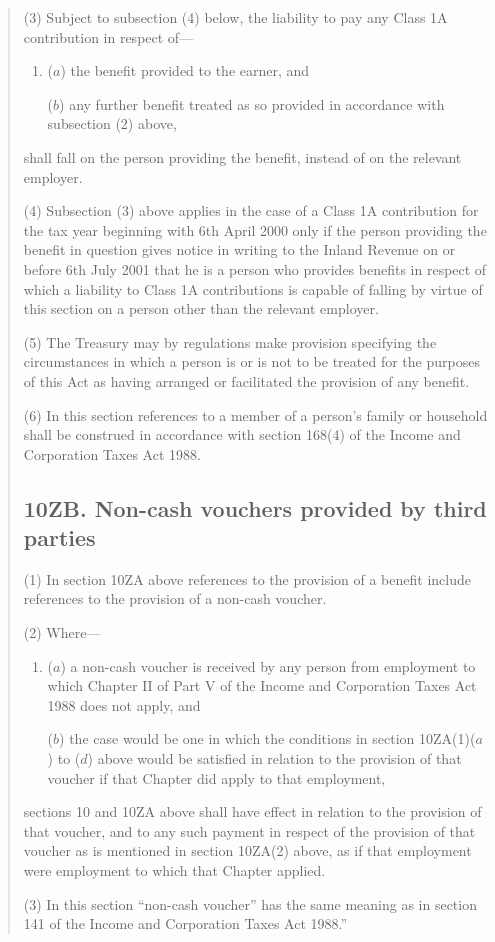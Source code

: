 \documentclass[12pt,a4paper]{article}
\begin{document}
\begin{quotation}
(3) Subject to subsection (4)  below, the liability to pay any Class 1A contribution in respect of—
\begin{enumerate}\item[]
($a$) the benefit provided to the earner, and

($b$) any further benefit treated as so provided in accordance with subsection (2)  above,
\end{enumerate}
shall fall on the person providing the benefit, instead of on the relevant employer.

(4) Subsection (3)  above applies in the case of a Class 1A contribution for the tax year beginning with 6th April 2000 only if the person providing the benefit in question gives notice in writing to the Inland Revenue on or before 6th July 2001 that he is a person who provides benefits in respect of which a liability to Class 1A contributions is capable of falling by virtue of this section on a person other than the relevant employer.

(5) The Treasury may by regulations make provision specifying the circumstances in which a person is or is not to be treated for the purposes of this Act as having arranged or facilitated the provision of any benefit.

(6) In this section references to a member of a person’s family or household shall be construed in accordance with section 168(4)  of the Income and Corporation Taxes Act 1988. 

\subsection*{10ZB. Non-cash vouchers provided by third parties}

(1) In section 10ZA above references to the provision of a benefit include references to the provision of a non-cash voucher.

(2) Where—
\begin{enumerate}\item[]
($a$) a non-cash voucher is received by any person from employment to which Chapter II of Part V of the Income and Corporation Taxes Act 1988 does not apply, and

($b$) the case would be one in which the conditions in section 10ZA(1)($a$)  to ($d$)  above would be satisfied in relation to the provision of that voucher if that Chapter did apply to that employment,
\end{enumerate}
sections 10 and 10ZA above shall have effect in relation to the provision of that voucher, and to any such payment in respect of the provision of that voucher as is mentioned in section 10ZA(2)  above, as if that employment were employment to which that Chapter applied.

(3) In this section “non-cash voucher” has the same meaning as in section 141 of the Income and Corporation Taxes Act 1988.”
\end{quotation}
\end{document}
